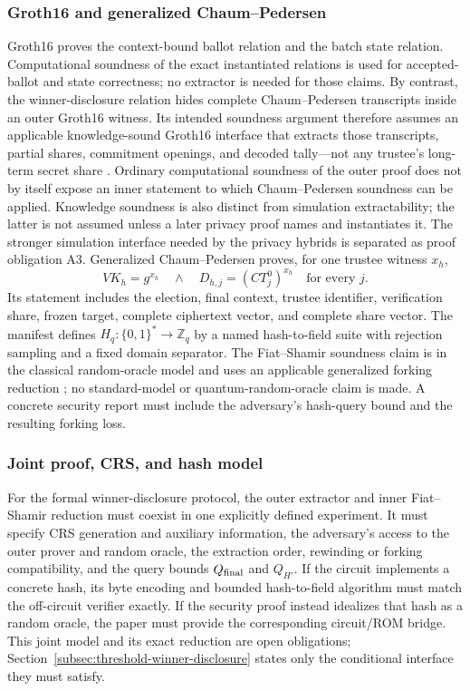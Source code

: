 \documentclass[pdflatex,sn-mathphys-num]{sn-jnl}%
\theoremstyle{thmstyleone}%
\theoremstyle{thmstyletwo}%
\theoremstyle{thmstylethree}%
\begin{document}
\subsubsection{Groth16 and generalized Chaum--Pedersen}\label{subsec:nizk}
Groth16 proves the context-bound ballot relation and the batch state relation.
Computational soundness of the exact instantiated relations is used for
accepted-ballot and state correctness; no extractor is needed for those
claims.  By contrast, the winner-disclosure relation hides complete
Chaum--Pedersen transcripts inside an outer Groth16 witness.  Its intended
soundness argument therefore assumes an applicable knowledge-sound Groth16
interface that extracts those transcripts, partial shares, commitment
openings, and decoded tally---not any trustee's long-term secret share
\cite{bib32,bib34}.  Ordinary computational soundness of the outer proof does
not by itself expose an inner statement to which Chaum--Pedersen soundness can
be applied.  Knowledge soundness is also distinct from simulation
extractability; the latter is not assumed unless a later privacy proof names
and instantiates it.  The
stronger simulation interface needed by the privacy hybrids is separated as
proof obligation A3.  Generalized Chaum--Pedersen proves, for one trustee
witness $x_h$,
\[
 VK_h=g^{x_h}\quad\land\quad
 D_{h,j}=(CT_j^0)^{x_h}\quad\text{for every }j.
\]
Its statement includes the election, final context, trustee identifier,
verification share, frozen target, complete ciphertext vector, and complete
share vector.
The manifest defines $H_q:\{0,1\}^*\rightarrow\mathbb Z_q$ by a named
hash-to-field suite with rejection sampling and a fixed domain separator.  The
Fiat--Shamir soundness claim is in the classical random-oracle model and uses
an applicable generalized forking reduction \cite{bib132}; no standard-model or
quantum-random-oracle claim is made.  A concrete security report must include
the adversary's hash-query bound and the resulting forking loss.

\subsubsection{Joint proof, CRS, and hash model}
\label{subsec:joint-proof-model}
For the formal winner-disclosure protocol, the outer extractor and inner
Fiat--Shamir reduction must coexist in one explicitly defined experiment.  It
must specify CRS generation and auxiliary information, the adversary's access
to the outer prover and random oracle, the extraction order, rewinding or
forking compatibility, and the query bounds $Q_{\rm final}$ and $Q_{H'}$.
If the circuit implements a concrete hash, its byte encoding and bounded
hash-to-field algorithm must match the off-circuit verifier exactly.  If the
security proof instead idealizes that hash as a random oracle, the paper must
provide the corresponding circuit/ROM bridge.  This joint model and its exact
reduction are open obligations; Section~\ref{subsec:threshold-winner-disclosure} states
only the conditional interface they must satisfy.
\end{document}
